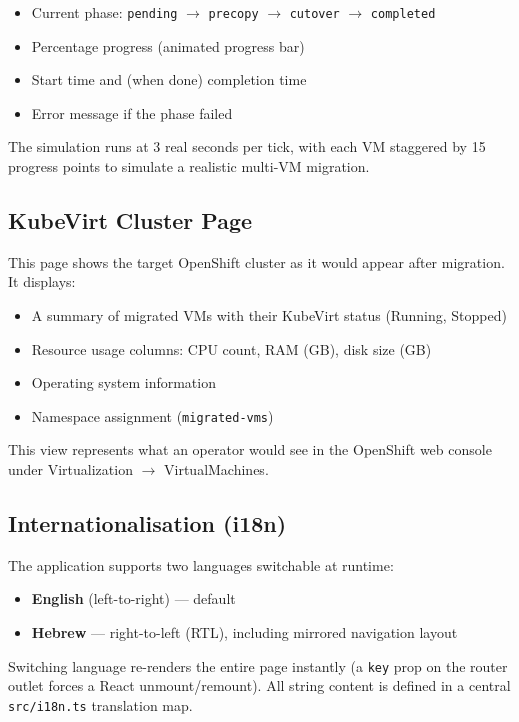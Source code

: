 \documentclass[12pt,a4paper]{article}
\begin{document}
\begin{itemize}
  \item Current phase: \texttt{pending} $\to$ \texttt{precopy} $\to$ \texttt{cutover} $\to$ \texttt{completed}
  \item Percentage progress (animated progress bar)
  \item Start time and (when done) completion time
  \item Error message if the phase failed
\end{itemize}

The simulation runs at 3 real seconds per tick, with each VM staggered by 15 progress points to simulate a realistic multi-VM migration.

\subsection{KubeVirt Cluster Page}

This page shows the target OpenShift cluster as it would appear after migration. It displays:

\begin{itemize}
  \item A summary of migrated VMs with their KubeVirt status (Running, Stopped)
  \item Resource usage columns: CPU count, RAM (GB), disk size (GB)
  \item Operating system information
  \item Namespace assignment (\texttt{migrated-vms})
\end{itemize}

This view represents what an operator would see in the OpenShift web console under Virtualization $\to$ VirtualMachines.

\subsection{Internationalisation (i18n)}

The application supports two languages switchable at runtime:

\begin{itemize}
  \item \textbf{English} (left-to-right) — default
  \item \textbf{Hebrew} — right-to-left (RTL), including mirrored navigation layout
\end{itemize}

Switching language re-renders the entire page instantly (a \texttt{key} prop on the router outlet forces a React unmount/remount). All string content is defined in a central \texttt{src/i18n.ts} translation map.
\end{document}
